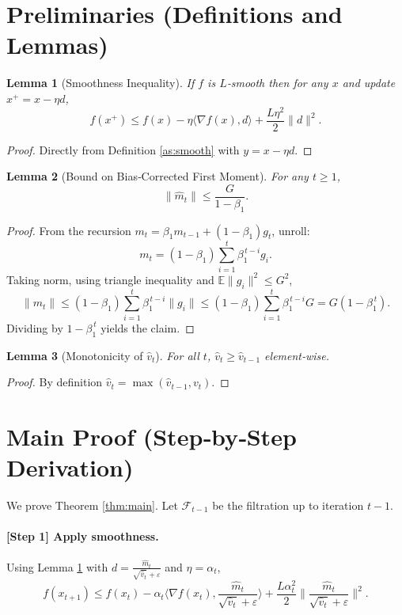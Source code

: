 \documentclass[11pt]{article}
\newtheorem{lemma}{Lemma}[section]
\begin{document}
\section*{Preliminaries (Definitions and Lemmas)}
\begin{lemma}[Smoothness Inequality]\label{lem:smooth}
If $f$ is $L$‑smooth then for any $x$ and update $x^+=x-\eta d$,
\[
f(x^+)\le f(x)-\eta\langle \nabla f(x),d\rangle+\frac{L\eta^2}{2}\|d\|^2 .
\]
\end{lemma}
\begin{proof}
Directly from Definition \ref{as:smooth} with $y=x-\eta d$.
\end{proof}
\begin{lemma}[Bound on Bias‑Corrected First Moment]\label{lem:m_bound}
For any $t\ge1$,
\[
\|\hat m_t\|\le \frac{G}{1-\beta_1}.
\]
\end{lemma}
\begin{proof}
From the recursion $m_t=\beta_1 m_{t-1}+(1-\beta_1)g_t$, unroll:
\[
m_t=(1-\beta_1)\sum_{i=1}^{t}\beta_1^{\,t-i}g_i .
\]
Taking norm, using triangle inequality and $\mathbb{E}\|g_i\|^2\le G^2$,
\[
\|m_t\|\le (1-\beta_1)\sum_{i=1}^{t}\beta_1^{\,t-i}\|g_i\|\le (1-\beta_1)\sum_{i=1}^{t}\beta_1^{\,t-i}G = G(1-\beta_1^{\,t}) .
\]
Dividing by $1-\beta_1^{\,t}$ yields the claim.
\end{proof}
\begin{lemma}[Monotonicity of $\hat v_t$]\label{lem:vt_mon}
For all $t$, $\hat v_t\ge \hat v_{t-1}$ element‑wise.
\end{lemma}
\begin{proof}
By definition $\hat v_t = \max(\hat v_{t-1},v_t)$.
\end{proof}

\section*{Main Proof (Step‑by‑Step Derivation)}
We prove Theorem \ref{thm:main}. Let $\mathcal{F}_{t-1}$ be the filtration up to iteration $t-1$.

\paragraph{[Step 1] Apply smoothness.}
Using Lemma \ref{lem:smooth} with $d=\frac{\hat m_t}{\sqrt{\hat v_t}+\varepsilon}$ and $\eta=\alpha_t$,
\[
f(x_{t+1})\le f(x_t)-\alpha_t\Big\langle\nabla f(x_t),\frac{\hat m_t}{\sqrt{\hat v_t}+\varepsilon}\Big\rangle
+\frac{L\alpha_t^{2}}{2}\Big\|\frac{\hat m_t}{\sqrt{\hat v_t}+\varepsilon}\Big\|^{2}.
\tag{3}
\]
\end{document}
